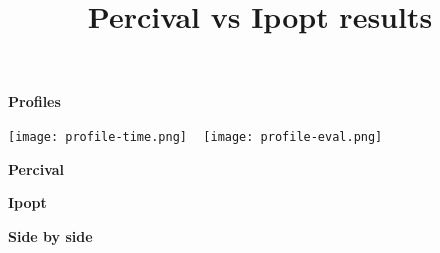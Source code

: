 \documentclass[10pt]{article}
\title{ Percival vs Ipopt results }
\begin{document}
\maketitle

\begin{center}
  \large \bf Profiles

  \texttt{[image: profile-time.png]}
  ~
  \texttt{[image: profile-eval.png]}
\end{center}

\scriptsize
\begin{center}
  \large \bf Percival
\end{center}


\begin{center}
  \large \bf Ipopt
\end{center}



\begin{center}
  \large \bf Side by side
\end{center}


\end{document}
